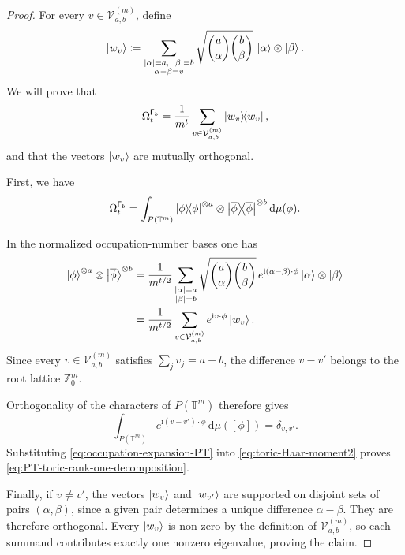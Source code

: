\documentclass[10pt,a4paper]{amsart}
\theoremstyle{plain}
\begin{document}
\begin{proof}

For every $v\in\mathcal{V}_{a,b}^{(m)}$, define
    \begin{equation}
        \ket{w_v}
        \coloneqq
        \sum_{\substack{|\alpha|=a,\ |\beta|=b\\
                        \alpha-\beta=v}}
        \sqrt{
            \binom{a}{\alpha}
            \binom{b}{\beta}
        }\,
        \ket{\alpha}\otimes\ket{\beta}.
        \label{eq:wv-definition}
    \end{equation}
    We will prove that
    \begin{equation}
        \Omega_t^{\mathsf{\Gamma}_b}
        =
        \frac{1}{m^t}
        \sum_{v\in\mathcal{V}_{a,b}^{(m)}}
        \ketbra{w_v},
        \label{eq:PT-toric-rank-one-decomposition}
    \end{equation}
    and that the vectors $\ket{w_v}$ are mutually orthogonal.

    First, we have
\begin{equation}
    \Omega_{t}^{\mathsf{\Gamma}_{b}}
    =
    \int_{P(\mathbb{T}^{m})}\ketbra{\phi}
    ^{\otimes a}\otimes\ketbra{\overline{\phi}}
    ^{\otimes b}
    \mathrm{d}\mu(\phi).
    \label{eq:toric-Haar-moment2}
\end{equation}


    
    In the normalized occupation-number bases one has
    \begin{align}
        \ket{\phi}^{\otimes a}
        \otimes
        \ket{\overline{\phi}}^{\otimes b}
        &=
        \frac{1}{m^{t/2}}
        \sum_{\substack{|\alpha|=a\\|\beta|=b}}
        \sqrt{
            \binom{a}{\alpha}
            \binom{b}{\beta}
        }\,
        e^{\mathrm{i}(\alpha-\beta)\cdot\phi}
        \ket{\alpha}\otimes\ket{\beta}
        \nonumber\\
        &=
        \frac{1}{m^{t/2}}
        \sum_{v\in\mathcal{V}_{a,b}^{(m)}}
        e^{\mathrm{i}v\cdot\phi}\ket{w_v}.
        \label{eq:occupation-expansion-PT}
    \end{align}
    Since every $v\in\mathcal{V}_{a,b}^{(m)}$ satisfies
    $\sum_jv_j=a-b$, the difference $v-v'$ belongs to the root lattice
    $\mathbb{Z}_{0}^{m}$.
   
    Orthogonality of the characters of $P(\mathbb{T}^{m})$ therefore gives
    \begin{equation}
        \int_{P(\mathbb{T}^{m})}
        e^{\mathrm{i}(v-v')\cdot\phi}
        \,\mathrm{d}\mu([\phi])
        =
        \delta_{v,v'}.
    \end{equation}
    Substituting \eqref{eq:occupation-expansion-PT} into
    \eqref{eq:toric-Haar-moment2} proves
    \eqref{eq:PT-toric-rank-one-decomposition}.

    Finally, if $v\neq v'$, the vectors $\ket{w_v}$ and
    $\ket{w_{v'}}$ are supported on disjoint sets of pairs
    $(\alpha,\beta)$, since a given pair determines a unique difference
    $\alpha-\beta$. They are therefore orthogonal. Every
    $\ket{w_v}$ is non-zero by the definition of
    $\mathcal{V}_{a,b}^{(m)}$, so each summand contributes exactly one
    nonzero eigenvalue, proving the claim.
\end{proof}
\end{document}
